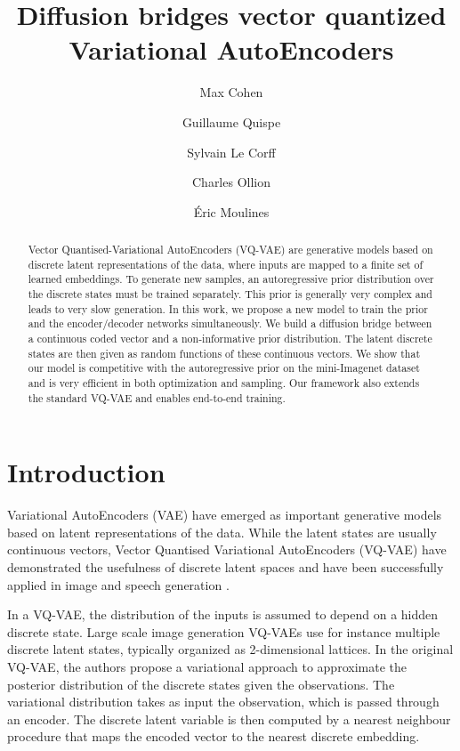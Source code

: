 \documentclass[nolayout]{article}
\title{Diffusion bridges  vector quantized Variational AutoEncoders}
\date{}
\author[$\star$]{Max Cohen}
\author[$\dag$]{Guillaume Quispe}
\author[$\star$]{Sylvain Le Corff}
\author[$\dag$]{Charles Ollion}
\author[$\dag$]{\'Eric Moulines}
\affil[$\star$]{{\small SAMOVAR, T\'el\'ecom SudParis, Institut Polytechnique de Paris, Palaiseau.}}
\affil[$\dag$]{{\small CMAP, \'Ecole Polytechnique, Institut Polytechnique de Paris, Palaiseau.}}
\theoremstyle{plain}
\theoremstyle{definition}
\theoremstyle{remark}
\begin{document}
\maketitle

\begin{abstract}
Vector Quantised-Variational AutoEncoders (VQ-VAE) are generative models based on discrete latent representations of the data, where inputs are mapped to a finite set of learned embeddings.
To generate new samples, an autoregressive prior distribution over the discrete states must be trained separately. This prior is generally very complex and leads to very slow generation. In this work, we propose a new model to train the prior and the encoder/decoder networks simultaneously. We build a diffusion bridge between a continuous coded vector and a non-informative prior distribution.  The latent discrete states are then given as random functions of these continuous vectors. We show that our model is competitive with the autoregressive prior on the mini-Imagenet dataset and is very efficient in both optimization and sampling. Our framework also extends the standard VQ-VAE and enables end-to-end training.
\end{abstract}


\section{Introduction}
Variational AutoEncoders (VAE) have emerged as important generative models based on latent representations of the data. 
While the latent states are usually continuous vectors, Vector Quantised Variational AutoEncoders (VQ-VAE) have demonstrated the usefulness of discrete latent spaces and have been successfully applied in image and speech generation \cite{oord2017neural, esser2021taming, ramesh2021zero}. 

In a VQ-VAE, the distribution of the inputs is assumed to depend on a hidden discrete state. Large scale image generation VQ-VAEs use for instance multiple discrete latent states, typically organized as 2-dimensional lattices. In the original VQ-VAE, the authors propose a variational approach to approximate the posterior distribution of the discrete states given the observations. The variational distribution takes as input the observation, which is passed through an encoder. The discrete latent variable is then computed by a nearest neighbour procedure that maps the encoded vector to the nearest discrete embedding. 
\end{document}
